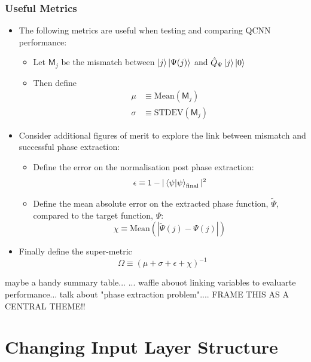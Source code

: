 \documentclass{beamer}
\begin{document}
\begin{frame}
\frametitle{Useful Metrics}
\begin{itemize}
\item The following metrics are useful when testing and comparing QCNN performance:
\begin{itemize}
\item Let $\mathsf{M}_j$ be the \alert{mismatch} between $\ket{j} \ket{\Psi(j)}$ and $\hat{Q}_\Psi \ket{j}\ket{0}$
\item Then define 
\begin{align}
\mu &\equiv \text{Mean}(\mathsf{M}_j) \\
\sigma &\equiv \text{STDEV}(\mathsf{M}_j)
\end{align}
\end{itemize}
\item Consider additional figures of merit to explore the \alert{link between mismatch and successful phase extraction}:
\begin{itemize}
\item Define the \alert{error on the normalisation} post phase extraction: 
\begin{equation}
\epsilon \equiv 1 - |\braket{\psi | \psi}_\text{final}|^2 
\end{equation}
\item Define the mean absolute \alert{error on the extracted phase function}, $\tilde{\Psi}$, compared to the target function, $\Psi$: 
\begin{equation}
\chi \equiv \text{Mean}(|\tilde{\Psi}(j) - \Psi(j)|)
\end{equation}
\end{itemize}
\item Finally define the \alert{super-metric} 
\begin{equation}
\Omega \equiv \left( \mu + \sigma + \epsilon + \chi \right)^{-1}
\end{equation}
\end{itemize}
\end{frame}

\begin{frame}
maybe a handy summary table...
... waffle abouot linking variables to evaluarte performance... talk about "phase extraction problem".... FRAME THIS AS A CENTRAL THEME!!
\end{frame}

\section{Changing Input Layer Structure}
\end{document}
